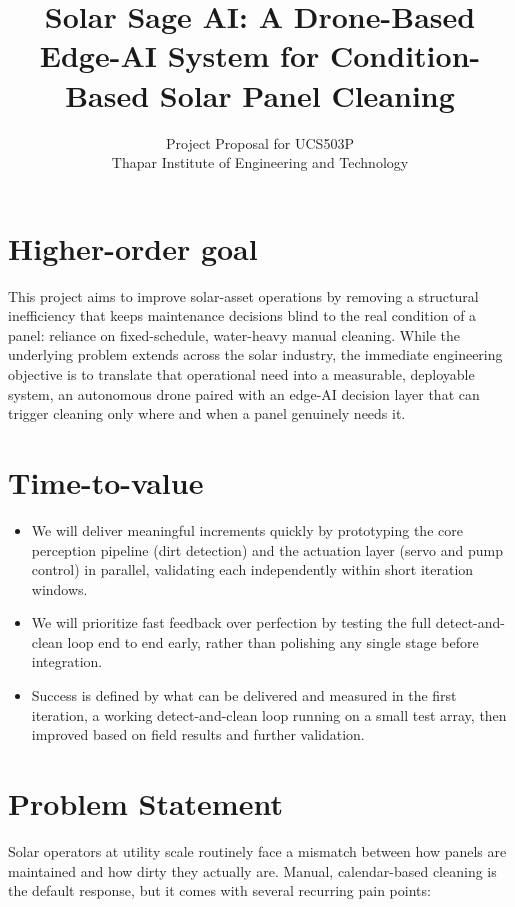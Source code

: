 \documentclass[11pt]{article}
\title{\textbf{Solar Sage AI: A Drone-Based Edge-AI System for Condition-Based Solar Panel Cleaning}}
\author{Project Proposal for UCS503P \\ Thapar Institute of Engineering and Technology}
\date{}
\begin{document}
\maketitle

\section{Higher-order goal}
This project aims to improve solar-asset operations by removing a structural inefficiency that keeps maintenance decisions blind to the real condition of a panel: reliance on fixed-schedule, water-heavy manual cleaning. While the underlying problem extends across the solar industry, the immediate engineering objective is to translate that operational need into a measurable, deployable system, an autonomous drone paired with an edge-AI decision layer that can trigger cleaning only where and when a panel genuinely needs it.

\section{Time-to-value}
\begin{itemize}
    \item We will deliver meaningful increments quickly by prototyping the core perception pipeline (dirt detection) and the actuation layer (servo and pump control) in parallel, validating each independently within short iteration windows.
    \item We will prioritize fast feedback over perfection by testing the full detect-and-clean loop end to end early, rather than polishing any single stage before integration.
    \item Success is defined by what can be delivered and measured in the first iteration, a working detect-and-clean loop running on a small test array, then improved based on field results and further validation.
\end{itemize}

\section{Problem Statement}
Solar operators at utility scale routinely face a mismatch between how panels are maintained and how dirty they actually are. Manual, calendar-based cleaning is the default response, but it comes with several recurring pain points:
\end{document}
